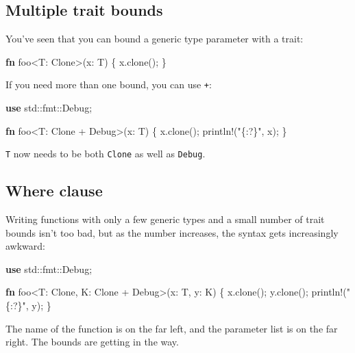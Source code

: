 \documentclass[a4paper,]{book}
\newenvironment{Shaded}{\begin{snugshade}}{\end{snugshade}}
\newcommand{\KeywordTok}[1]{\textcolor[rgb]{0.13,0.29,0.53}{\textbf{{#1}}}}
\newcommand{\StringTok}[1]{\textcolor[rgb]{0.31,0.60,0.02}{{#1}}}
\newcommand{\OtherTok}[1]{\textcolor[rgb]{0.56,0.35,0.01}{{#1}}}
\newcommand{\NormalTok}[1]{{#1}}
\begin{document}
\subsection{Multiple trait bounds}\label{multiple-trait-bounds}

You've seen that you can bound a generic type parameter with a trait:

\begin{Shaded}
\begin{Highlighting}[]
\KeywordTok{fn} \NormalTok{foo<T: Clone>(x: T) \{}
    \NormalTok{x.clone();}
\NormalTok{\}}
\end{Highlighting}
\end{Shaded}

If you need more than one bound, you can use \texttt{+}:

\begin{Shaded}
\begin{Highlighting}[]
\KeywordTok{use} \NormalTok{std::fmt::Debug;}

\KeywordTok{fn} \NormalTok{foo<T: Clone + Debug>(x: T) \{}
    \NormalTok{x.clone();}
    \OtherTok{println!}\NormalTok{(}\StringTok{"\{:?\}"}\NormalTok{, x);}
\NormalTok{\}}
\end{Highlighting}
\end{Shaded}

\texttt{T} now needs to be both \texttt{Clone} as well as
\texttt{Debug}.

\subsection{Where clause}\label{where-clause}

Writing functions with only a few generic types and a small number of
trait bounds isn't too bad, but as the number increases, the syntax gets
increasingly awkward:

\begin{Shaded}
\begin{Highlighting}[]
\KeywordTok{use} \NormalTok{std::fmt::Debug;}

\KeywordTok{fn} \NormalTok{foo<T: Clone, K: Clone + Debug>(x: T, y: K) \{}
    \NormalTok{x.clone();}
    \NormalTok{y.clone();}
    \OtherTok{println!}\NormalTok{(}\StringTok{"\{:?\}"}\NormalTok{, y);}
\NormalTok{\}}
\end{Highlighting}
\end{Shaded}

The name of the function is on the far left, and the parameter list is
on the far right. The bounds are getting in the way.
\end{document}
